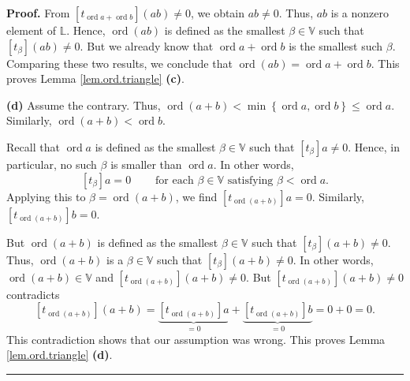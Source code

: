 \documentclass[numbers=enddot,12pt,final,onecolumn,notitlepage]{scrartcl}%
\theoremstyle{definition}
\newenvironment{proof}[1][Proof]{\noindent\textbf{#1.} }{\ \rule{0.5em}{0.5em}}
\renewcommand{\leq}{\leqslant}
\theoremstyle{plainsl}
\begin{document}
\begin{proof}
From $\left[  t_{\operatorname*{ord}a+\operatorname*{ord}b}\right]  \left(
ab\right)  \neq0$, we obtain $ab\neq0$. Thus, $ab$ is a nonzero element of
$\mathbb{L}$. Hence, $\operatorname*{ord}\left(  ab\right)  $ is defined as
the smallest $\beta\in\mathbb{V}$ such that $\left[  t_{\beta}\right]  \left(
ab\right)  \neq0$. But we already know that $\operatorname*{ord}%
a+\operatorname*{ord}b$ is the smallest such $\beta$. Comparing these two
results, we conclude that $\operatorname*{ord}\left(  ab\right)
=\operatorname*{ord}a+\operatorname*{ord}b$. This proves Lemma
\ref{lem.ord.triangle} \textbf{(c)}. \medskip

\textbf{(d)} Assume the contrary. Thus, $\operatorname*{ord}\left(
a+b\right)  <\min\left\{  \operatorname*{ord}a,\operatorname*{ord}b\right\}
\leq\operatorname*{ord}a$. Similarly, $\operatorname*{ord}\left(  a+b\right)
<\operatorname*{ord}b$.

Recall that $\operatorname*{ord}a$ is defined as the smallest $\beta
\in\mathbb{V}$ such that $\left[  t_{\beta}\right]  a\neq0$. Hence, in
particular, no such $\beta$ is smaller than $\operatorname*{ord}a$. In other
words,
\[
\left[  t_{\beta}\right]  a=0\ \ \ \ \ \ \ \ \ \ \text{for each }\beta
\in\mathbb{V}\text{ satisfying }\beta<\operatorname*{ord}a.
\]
Applying this to $\beta=\operatorname*{ord}\left(  a+b\right)  $, we find
$\left[  t_{\operatorname*{ord}\left(  a+b\right)  }\right]  a=0$. Similarly,
$\left[  t_{\operatorname*{ord}\left(  a+b\right)  }\right]  b=0$.

But $\operatorname*{ord}\left(  a+b\right)  $ is defined as the smallest
$\beta\in\mathbb{V}$ such that $\left[  t_{\beta}\right]  \left(  a+b\right)
\neq0$. Thus, $\operatorname*{ord}\left(  a+b\right)  $ is a $\beta
\in\mathbb{V}$ such that $\left[  t_{\beta}\right]  \left(  a+b\right)  \neq
0$. In other words, $\operatorname*{ord}\left(  a+b\right)  \in\mathbb{V}$ and
$\left[  t_{\operatorname*{ord}\left(  a+b\right)  }\right]  \left(
a+b\right)  \neq0$. But $\left[  t_{\operatorname*{ord}\left(  a+b\right)
}\right]  \left(  a+b\right)  \neq0$ contradicts%
\[
\left[  t_{\operatorname*{ord}\left(  a+b\right)  }\right]  \left(
a+b\right)  =\underbrace{\left[  t_{\operatorname*{ord}\left(  a+b\right)
}\right]  a}_{=0}+\underbrace{\left[  t_{\operatorname*{ord}\left(
a+b\right)  }\right]  b}_{=0}=0+0=0.
\]
This contradiction shows that our assumption was wrong. This proves Lemma
\ref{lem.ord.triangle} \textbf{(d)}.
\end{proof}
\end{document}
